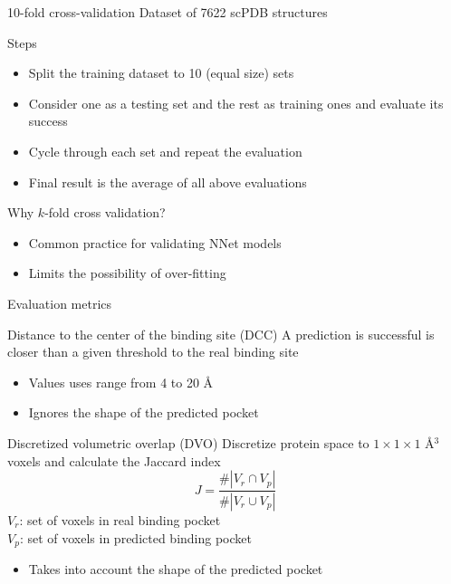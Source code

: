 \documentclass{beamer}
\begin{document}
\begin{frame}{10-fold cross-validation}
  Dataset of 7622 scPDB structures
  \begin{block}{Steps}
    \begin{itemize}
      \item Split the training dataset to 10 (equal size) sets
      \item Consider one as a testing set and the rest as training ones and evaluate its success
      \item Cycle through each set and repeat the evaluation
      \item Final result is the average of all above evaluations
    \end{itemize}
  \end{block}
  \begin{block}{Why $k$-fold cross validation?}
    \begin{itemize}
      \item Common practice for validating NNet models
      \item Limits the possibility of over-fitting
    \end{itemize}
  \end{block}
\end{frame}

\begin{frame}{Evaluation metrics}
  \begin{block}{Distance to the center of the binding site (DCC)}
    A prediction is successful is closer than a given threshold to the real binding site
    \begin{itemize}
      \item Values uses range from 4 to 20 \AA
      \item Ignores the shape of the predicted pocket
    \end{itemize}
  \end{block}
  \begin{block}{Discretized volumetric overlap (DVO)}
    Discretize protein space to $1 \times 1 \times 1$ \AA$^3$ voxels and calculate the Jaccard index
    \[
      J = \frac{\#|V_r \cap V_p|}{\#|V_r \cup V_p|}
    \]
    $V_r$: set of voxels in real binding pocket\\
    $V_p$: set of voxels in predicted binding pocket
    \begin{itemize}
      \item Takes into account the shape of the predicted pocket
    \end{itemize}
  \end{block}
\end{frame}
\end{document}
